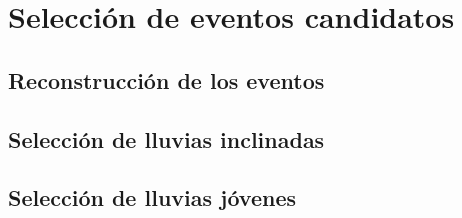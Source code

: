 \chapter{Selecci\'on de eventos candidatos}

\section{Reconstrucci\'on de los eventos}

\section{Selecci\'on de lluvias inclinadas}

\section{Selecci\'on de lluvias j\'ovenes}

